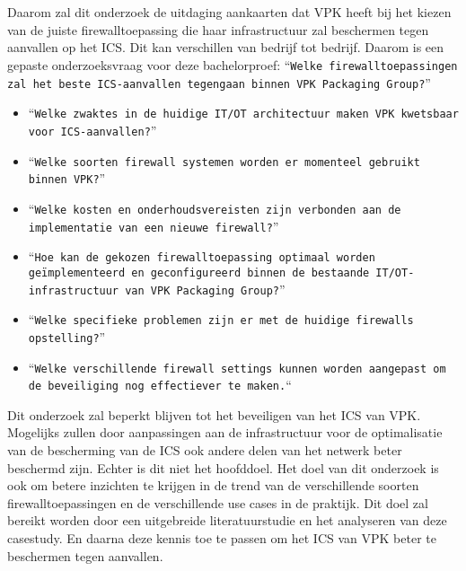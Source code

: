 \section{}%
\label{sec:onderzoeksvraag}

Daarom zal dit onderzoek de uitdaging aankaarten dat VPK heeft bij het kiezen van de juiste firewalltoepassing die haar infrastructuur zal beschermen tegen aanvallen op het ICS. Dit kan verschillen van bedrijf tot bedrijf. Daarom is een gepaste onderzoeksvraag voor deze bachelorproef: ``\texttt{Welke firewalltoepassingen zal het beste ICS-aanvallen tegengaan binnen VPK Packaging Group?}''

\begin{itemize}
    \item ``\texttt{Welke zwaktes in de huidige IT/OT architectuur maken VPK kwetsbaar voor ICS-aanvallen?}''
    \item ``\texttt{Welke soorten firewall systemen worden er momenteel gebruikt binnen VPK?}''
    \item ``\texttt{Welke kosten en onderhoudsvereisten zijn verbonden aan de implementatie van een nieuwe firewall?}''
    \item ``\texttt{Hoe kan de gekozen firewalltoepassing optimaal worden geïmplementeerd en geconfigureerd binnen de bestaande IT/OT-infrastructuur van VPK Packaging Group?}''
    \item ``\texttt{Welke specifieke problemen zijn er met de huidige firewalls opstelling?}''
    \item ``\texttt{Welke verschillende firewall settings kunnen worden aangepast om de beveiliging nog effectiever te maken.}``
    \end{itemize}
    


Dit onderzoek zal beperkt blijven tot het beveiligen van het ICS van VPK. Mogelijks zullen door aanpassingen aan de infrastructuur voor de optimalisatie van de bescherming van de ICS ook andere delen van het netwerk beter beschermd zijn. Echter is dit niet het hoofddoel. Het doel van dit onderzoek is ook om betere inzichten te krijgen in de trend van de verschillende soorten firewalltoepassingen en de verschillende use cases in de praktijk. Dit doel zal bereikt worden door een uitgebreide literatuurstudie en het analyseren van deze casestudy. En daarna deze kennis toe te passen om het ICS van VPK beter te beschermen tegen aanvallen.

\section{}%
\label{sec:onderzoeksdoelstelling}

